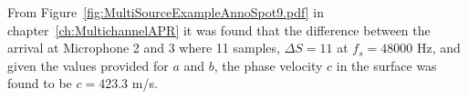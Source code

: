 From Figure~\ref{fig:MultiSourceExampleAnnoSpot9.pdf} in chapter~\ref{ch:MultichannelAPR} it was found that the difference between the arrival at Microphone 2 and 3 where 11 samples, $\Delta S = 11$ at $f_s = 48000$ Hz, and given the values provided for $a$ and $b$, the phase velocity $c$ in the surface was found to be $c = 423.3 $ m/s.



